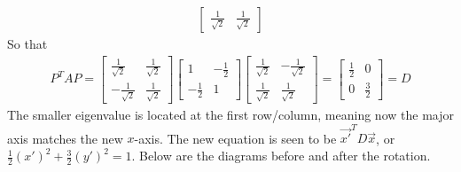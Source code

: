 \begin{exmp}
\begin{align*}
\begin{bmatrix}
\frac{1}{\sqrt{2}} & \frac{1}{\sqrt{2}}
\end{bmatrix}
\end{align*}
So that
\begin{align*}
P^T AP = 
\begin{bmatrix}
\frac{1}{\sqrt{2}} & \frac{1}{\sqrt{2}} \\
-\frac{1}{\sqrt{2}} & \frac{1}{\sqrt{2}}
\end{bmatrix}
\begin{bmatrix}
1 & -\frac{1}{2} \\
-\frac{1}{2} & 1
\end{bmatrix}
\begin{bmatrix}
\frac{1}{\sqrt{2}} & -\frac{1}{\sqrt{2}} \\
\frac{1}{\sqrt{2}} & \frac{1}{\sqrt{2}}
\end{bmatrix}
=
\begin{bmatrix}
\frac{1}{2} & 0\\
0 & \frac{3}{2}
\end{bmatrix}
= D
\end{align*}
The smaller eigenvalue is located at the first row/column, meaning now the major axis matches the new $x$-axis. The new equation is seen to be $\vec{x'}^T D\vec{x}$, or $\frac{1}{2}(x')^2 + \frac{3}{2}(y')^2 = 1$. Below are the diagrams before and after the rotation.


\end{exmp}
